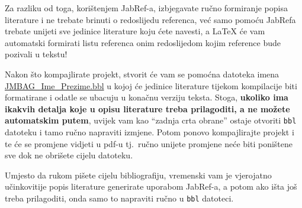 Za razliku od toga, korištenjem JabRef-a, izbjegavate ručno formiranje popisa literature i ne trebate brinuti o redoslijedu referenca, već samo pomoću JabRefa trebate unijeti sve jedinice literature koju ćete navesti, a \LaTeX{} će vam automatski formirati listu referenca onim redoslijedom kojim reference bude pozivali u tekstu!

Nakon što kompajlirate projekt, stvorit će vam se pomoćna datoteka imena \href{run:JMBAG_Ime_Prezime.bbl}{{\color{blue}JMBAG\_Ime\_Prezime.bbl}} u kojoj će jedinice literature tijekom kompilacije biti formatirane i odatle se ubacuju u konačnu verziju teksta. Stoga, \textbf{ukoliko ima ikakvih detalja koje u opisu literature treba prilagoditi, a ne možete automatskim putem}, uvijek vam kao ``zadnja crta obrane'' ostaje otvoriti \verb|bbl| datoteku i tamo ručno napraviti izmjene. Potom ponovo kompajlirajte projekt i te će se promjene vidjeti u pdf-u tj.\ ručno unijete promjene neće biti poništene sve dok ne obrišete cijelu datoteku.

Umjesto da rukom pišete cijelu bibliografiju, vremenski vam je vjerojatno učinko\-vitije popis literature generirate uporabom JabRef-a, a potom ako išta još treba prilagoditi, onda samo to napraviti ručno u \verb|bbl| datoteci.


